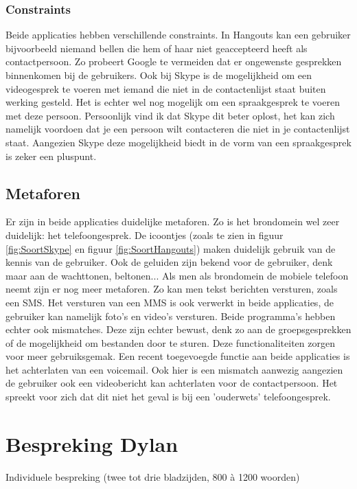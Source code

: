 \documentclass[11pt]{article}
\begin{document}
 \subsubsection{Constraints}
Beide applicaties hebben verschillende constraints. In Hangouts kan een gebruiker bijvoorbeeld niemand bellen die hem of haar niet geaccepteerd heeft als contactpersoon. Zo probeert Google te vermeiden dat er ongewenste gesprekken binnenkomen bij de gebruikers. Ook bij Skype is de mogelijkheid om een videogesprek te voeren met iemand die niet in de contactenlijst staat buiten werking gesteld. Het is echter wel nog mogelijk om een spraakgesprek te voeren met deze persoon. Persoonlijk vind ik dat Skype dit beter oplost, het kan zich namelijk voordoen dat je een persoon wilt contacteren die niet in je contactenlijst staat. Aangezien Skype deze mogelijkheid biedt in de vorm van een spraakgesprek is zeker een pluspunt.
\subsection{Metaforen}
Er zijn in beide applicaties duidelijke metaforen. Zo is het brondomein wel zeer duidelijk: het telefoongesprek. De icoontjes (zoals te zien in figuur \ref{fig:SoortSkype} en figuur \ref{fig:SoortHangouts}) maken duidelijk gebruik van de kennis van de gebruiker. Ook de geluiden zijn bekend voor de gebruiker, denk maar aan de wachttonen, beltonen... 
\newline
Als men als brondomein de mobiele telefoon neemt zijn er nog meer metaforen. Zo kan men tekst berichten versturen, zoals een SMS. Het versturen van een MMS is ook verwerkt in beide applicaties, de gebruiker kan namelijk foto's en video's versturen. 
\newline
Beide programma's hebben echter ook mismatches. Deze zijn echter bewust, denk zo aan de groepsgesprekken of de mogelijkheid om bestanden door te sturen. Deze functionaliteiten zorgen voor meer gebruiksgemak. 
\newline
Een recent toegevoegde functie aan beide applicaties is het achterlaten van een voicemail. Ook hier is een mismatch aanwezig aangezien de gebruiker ook een videobericht kan achterlaten voor de contactpersoon. Het spreekt voor zich dat dit niet het geval is bij een 'ouderwets' telefoongesprek.
\newpage

\section{Bespreking Dylan}
Individuele bespreking (twee tot drie bladzijden, 800 à 1200 woorden)
\end{document}
